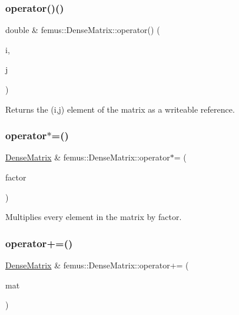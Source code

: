 \subsubsection{\texorpdfstring{operator()()}{operator()()}\hspace{0.1cm}{\footnotesize\ttfamily [2/2]}}
{\footnotesize\ttfamily double \& femus\+::\+Dense\+Matrix\+::operator() (\begin{DoxyParamCaption}\item[{const int}]{i,  }\item[{const int}]{j }\end{DoxyParamCaption})\hspace{0.3cm}{\ttfamily [inline]}}

\begin{DoxyReturn}{Returns}
the {\ttfamily }(i,j) element of the matrix as a writeable reference. 
\end{DoxyReturn}
\mbox{\label{classfemus_1_1_dense_matrix_a748804467957e01dfc7a51dc8edefb8f}} 
\subsubsection{\texorpdfstring{operator$\ast$=()}{operator*=()}}
{\footnotesize\ttfamily \mbox{\hyperlink{classfemus_1_1_dense_matrix}{Dense\+Matrix}} \& femus\+::\+Dense\+Matrix\+::operator$\ast$= (\begin{DoxyParamCaption}\item[{const double}]{factor }\end{DoxyParamCaption})\hspace{0.3cm}{\ttfamily [inline]}}



Multiplies every element in the matrix by {\ttfamily factor}. 

\mbox{\label{classfemus_1_1_dense_matrix_adaadf49cb5433b9211287fad5e5857df}} 
\subsubsection{\texorpdfstring{operator+=()}{operator+=()}}
{\footnotesize\ttfamily \mbox{\hyperlink{classfemus_1_1_dense_matrix}{Dense\+Matrix}} \& femus\+::\+Dense\+Matrix\+::operator+= (\begin{DoxyParamCaption}\item[{const \mbox{\hyperlink{classfemus_1_1_dense_matrix}{Dense\+Matrix}} \&}]{mat }\end{DoxyParamCaption})\hspace{0.3cm}{\ttfamily [inline]}}



